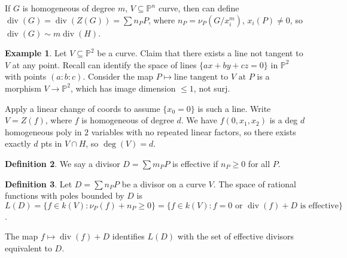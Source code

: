 \documentclass{article}
\theoremstyle{definition}
\newtheorem{defn}{Definition}[section]
\newtheorem{example}[defn]{Example}
\theoremstyle{remark}
\theoremstyle{plain}
\newcommand{\PP}{\mathbb{P}}
\begin{document}
If $G$ is homogeneous of degree $m$, $V\subseteq\PP^n$ curve, then can define $\operatorname{div}(G)=\operatorname{div}(Z(G))=\sum n_PP$, where $n_P=\nu_P(G/x_i^m)$, $x_i(P)\neq0$, so $\operatorname{div}(G)\sim m\operatorname{div}(H)$.
\begin{example}
    Let $V\subseteq\PP^2$ be a curve. Claim that there exists a line not tangent to $V$ at any point. Recall can identify the space of lines $\{ax+by+cz=0\}$ in $\PP^2$ with points $(a:b:c)$. Consider the map $P\mapsto \text{line tangent to $V$ at $P$}$ is a morphism $V\to\PP^2$, which has image dimension $\le 1$, not surj.
    
    Apply a linear change of coords to assume $\{x_0=0\}$ is such a line. Write $V=Z(f)$, where $f$ is homogeneous of degree $d$. We have $f(0,x_1,x_2)$ is a deg $d$ homogeneous poly in $2$ variables with no repeated linear factors, so there exists exactly $d$ pts in $V\cap H$, so $\deg(V)=d$.
\end{example}
\begin{defn}
    We say a divisor $D=\sum m_PP$ is effective if $n_P\ge 0$ for all $P$. 
\end{defn}
\begin{defn}
    Let $D=\sum n_PP$ be a divisor on a curve $V$. The space of rational functions with poles bounded by $D$ is $L(D)=\{f\in k(V):\nu_P(f)+n_P\ge 0\}=\{f\in k(V):f=0\text{ or }\operatorname{div}(f)+D\text{ is effective}\}$.
\end{defn}
The map $f\mapsto \operatorname{div}(f)+D$ identifies $L(D)$ with the set of effective divisors equivalent to $D$.
\end{document}
